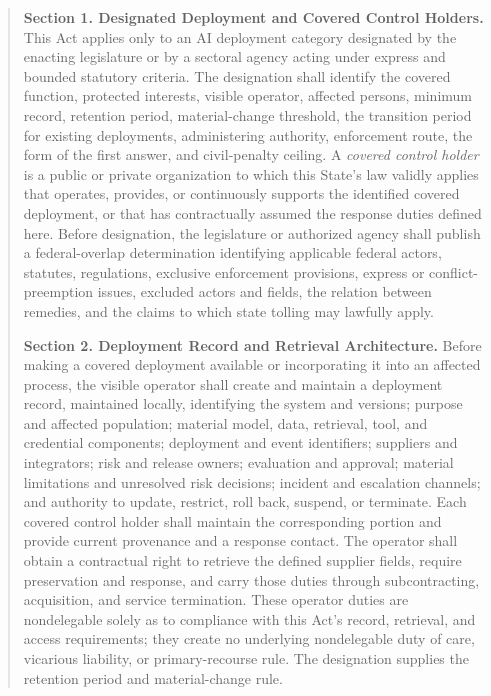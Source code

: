 \begin{quote}
\small
\textbf{Section 1. Designated Deployment and Covered Control Holders.} This Act applies only to an AI deployment category designated by the enacting legislature or by a sectoral agency acting under express and bounded statutory criteria. The designation shall identify the covered function, protected interests, visible operator, affected persons, minimum record, retention period, material-change threshold, the transition period for existing deployments, administering authority, enforcement route, the form of the first answer, and civil-penalty ceiling. A \emph{covered control holder} is a public or private organization to which this State's law validly applies that operates, provides, or continuously supports the identified covered deployment, or that has contractually assumed the response duties defined here. Before designation, the legislature or authorized agency shall publish a federal-overlap determination identifying applicable federal actors, statutes, regulations, exclusive enforcement provisions, express or conflict-preemption issues, excluded actors and fields, the relation between remedies, and the claims to which state tolling may lawfully apply.

\textbf{Section 2. Deployment Record and Retrieval Architecture.} Before making a covered deployment available or incorporating it into an affected process, the visible operator shall create and maintain a deployment record, maintained locally, identifying the system and versions; purpose and affected population; material model, data, retrieval, tool, and credential components; deployment and event identifiers; suppliers and integrators; risk and release owners; evaluation and approval; material limitations and unresolved risk decisions; incident and escalation channels; and authority to update, restrict, roll back, suspend, or terminate. Each covered control holder shall maintain the corresponding portion and provide current provenance and a response contact. The operator shall obtain a contractual right to retrieve the defined supplier fields, require preservation and response, and carry those duties through subcontracting, acquisition, and service termination. These operator duties are nondelegable solely as to compliance with this Act's record, retrieval, and access requirements; they create no underlying nondelegable duty of care, vicarious liability, or primary-recourse rule. The designation supplies the retention period and material-change rule.


\end{quote}
